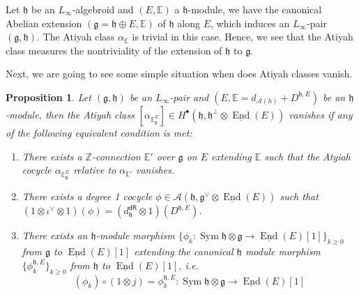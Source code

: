 \documentclass[12pt]{amsart}
\newtheorem{prop}[thm]{Proposition}
\theoremstyle{definition}
\theoremstyle{remark}
\numberwithin{equation}{section}
\newcommand{\CA}{{\mathcal A}}
\newcommand{\Z}{{\mathbb{Z}}}
\newcommand{\1}{{\mathbb{1}}}
\newcommand{\g}{\mathfrak{g}}
\newcommand{\h}{\mathfrak{h}}
\newcommand{\dr}{\mathsf{dR}}
\newcommand{\End}{\operatorname{End}}
\newcommand{\sym}{\operatorname{Sym}}
\begin{document}
Let $\h$ be an $L_{\infty}$-algebroid and $(E, \mathbb{E})$ a $\h$-module, we have the canonical Abelian extension $( \g = \h \oplus E, \mathbb{E})$ of $\h$ along $E$, which induces an $L_{\infty}$-pair $(\g, \h)$. The Atiyah class $\alpha_{\mathbb{E}}$ is trivial in this case. Hence, we see that the Atiyah class measures the nontriviality of the extension of $\h$ to $\g$. 

Next, we are going to see some simple situation when does Atiyah classes vanish.

\begin{prop}
Let $(\g, \h)$ be an $L_{\infty}$-pair and $(E, \mathbb{E} = d_{\CA(h)} + D^{\h, E})$ be an $\h$-module, then the Atiyah class $[\alpha_{\mathbb{E}_{\g}^E}] \in H^{\bullet}(\h, \h^{\perp}\otimes \underline{\End}(E))$ vanishes if any of the following equivalent condition is met:
\begin{enumerate}

    \item There exists a $\Z$-connection $\mathbb{E}'$ over $\g$ on $E$ extending $\mathbb{E}$ such that the Atyiah cocycle $\alpha_{\mathbb{E}_{\g}^E}$ relative to $\alpha_{\mathbb{E'}}$ vanishes.
    
    \item There exists a degree 1 cocycle $\phi \in \CA(\h, \g^{\vee}\otimes \underline{\End}(E))$ such that $(1\otimes \iota^{\vee} \otimes 1)(\phi) = (d_{\h}^{\dr} \otimes 1)(D^{\h, E})$.
    
    \item There exists an $\h$-module morphism $\{\phi_k: \sym \h \otimes \g \to \underline{\End}(E)[1]\}_{k \ge 0}$ from $\g$ to $\underline{\End}(E)[1]$ extending the canonical $\h$ module morphism $\{\phi_k^{\h, E}\}_{k \ge 0}$ from $\h$ to $\underline{\End}(E)[1]$, i.e.
    \begin{equation*}
        (\phi_k)\circ (1\otimes j) = \phi_k^{\h, E} : \sym \h \otimes \g \to \underline{\End}(E)[1]
    \end{equation*}
    
    
\end{enumerate}
\end{prop}
\end{document}

